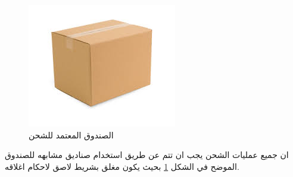 \documentclass{article}
\begin{document}
\begin{figure}[h]
\includegraphics{box}
\caption{\textarabic{الصندوق المعتمد للشحن}}
\label{box1}
\end{figure}
ان جميع عمليات الشحن يجب ان تتم عن طريق استخدام صناديق مشابهه للصندوق الموضح في الشكل
\ref{box1}
بحيث يكون مغلق بشريط لاصق لاحكام اغلاقه.
\end{document}
